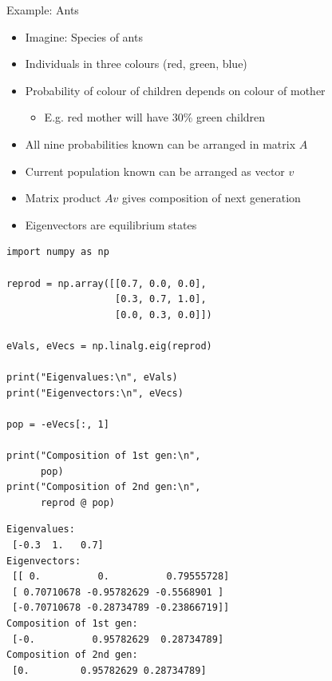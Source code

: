 
\begin{frame}{Example: Ants}
%
\begin{itemize}
\item Imagine: Species of ants
\item Individuals in three colours (red, green, blue)
\item Probability of colour of children depends on colour of mother
	\begin{itemize}
	\item E.\;g. red mother will have 30\% green children
	\end{itemize}
\item All nine probabilities known \Thus can be arranged in matrix $A$
\item Current population known \Thus can be arranged as vector $v$
\item[\Thus] Matrix product $Av$ gives composition of next generation
\item[\Thus] Eigenvectors are equilibrium states
\end{itemize}
%
\end{frame}


\begin{frame}[fragile]
%
\begin{tcbraster}[raster columns=2,
                  raster equal height,
                  nobeforeafter,
                  raster column skip=0.2cm]
\begin{codebox}
\begin{verbatim}
import numpy as np

reprod = np.array([[0.7, 0.0, 0.0],
                   [0.3, 0.7, 1.0],
                   [0.0, 0.3, 0.0]])

eVals, eVecs = np.linalg.eig(reprod)

print("Eigenvalues:\n", eVals)
print("Eigenvectors:\n", eVecs)

pop = -eVecs[:, 1]

print("Composition of 1st gen:\n",
      pop)
print("Composition of 2nd gen:\n",
      reprod @ pop)
\end{verbatim}
\end{codebox}
%
\begin{cmdbox}
\begin{verbatim}
Eigenvalues:
 [-0.3  1.   0.7]
Eigenvectors:
 [[ 0.          0.          0.79555728]
 [ 0.70710678 -0.95782629 -0.5568901 ]
 [-0.70710678 -0.28734789 -0.23866719]]
Composition of 1st gen:
 [-0.          0.95782629  0.28734789]
Composition of 2nd gen:
 [0.         0.95782629 0.28734789]
\end{verbatim}
\end{cmdbox}
\end{tcbraster}
%
\end{frame}


